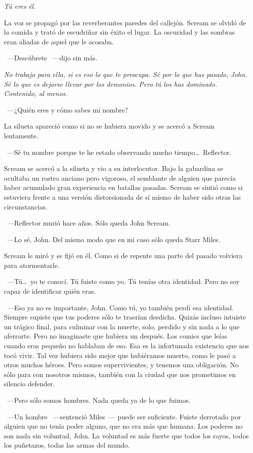 \emph{Tú eres él.}

La voz se propagó por las reverberantes paredes del callejón. Scream se olvidó de la comida y trató de escudriñar sin éxito el lugar. La oscuridad y las sombras eran aliadas de aquel que le acosaba.

~---Descúbrete ~---dijo sin más.

\emph{No trabajo para ella, si es eso lo que te preocupa. Sé por lo que has pasado, John. Sé lo que es dejarse llevar por los demonios. Pero tú los has dominado. Contenido, al menos.}

~---¿Quién eres y cómo sabes mi nombre?

La silueta apareció como si no se hubiera movido y se acercó a Scream lentamente.

~---Sé tu nombre porque te he estado observando mucho tiempo\dots\ Reflector.

Scream se acercó a la silueta y vio a su interlocutor. Bajo la gabardina se ocultaba un rostro anciano pero vigoroso, el semblante de alguien que parecía haber acumulado gran experiencia en batallas pasadas. Scream se sintió como si estuviera frente a una versión distorsionada de sí mismo de haber sido otras las circunstancias.

~---Reflector murió hace años. Sólo queda John Scream.

~---Lo sé, John. Del mismo modo que en mi caso sólo queda Starr Miles.

Scream le miró y se fijó en él. Como si de repente una parte del pasado volviera para atormentarle.

~---Tú\dots\ yo te conocí. Tú fuiste como yo. Tú tenías otra identidad. Pero no soy capaz de identificar quién eras.

~---Eso ya no es importante, John. Como tú, yo también perdí esa identidad. Siempre supiste que tus poderes sólo te traerían desdicha. Quizás incluso intuiste un trágico final, para culminar con la muerte, solo, perdido y sin nada a lo que aferrarte. Pero no imaginaste que hubiera un después. Los comics que leías cuando eras pequeño no hablaban de eso. Esa es la infortunada existencia que nos tocó vivir. Tal vez hubiera sido mejor que hubiéramos muerto, como le pasó a otros muchos héroes. Pero somos supervivientes, y tenemos una obligación. No sólo para con nosotros mismos, también con la ciudad que nos prometimos en silencio defender.

~---Pero sólo somos hombres. Nada queda ya de lo que fuimos.

~---Un hombre ~---sentenció Miles~--- puede ser suficiente. Fuiste derrotado por alguien que no tenía poder alguno, que no era más que humana. Los poderes no son nada sin voluntad, John. La voluntad es más fuerte que todos los rayos, todos los puñetazos, todas las armas del mundo.

